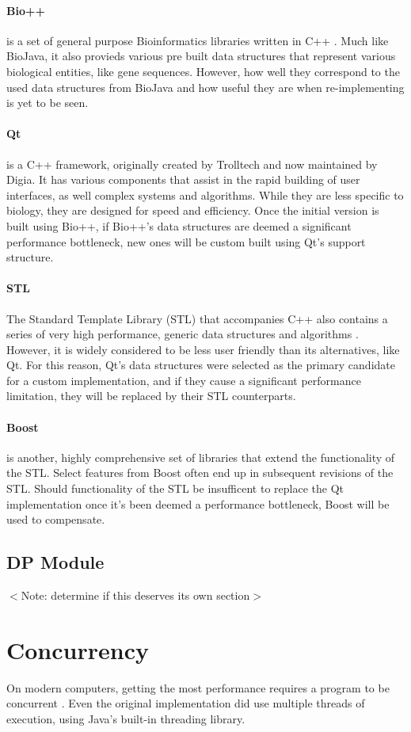\documentclass[a4paper,12pt]{report}
\begin{document}
\paragraph{Bio++}
is a set of general purpose Bioinformatics libraries written in C++ \autocite{bpp}. Much like BioJava, it also provieds various pre built data structures that represent various biological entities, like gene sequences. However, how well they correspond to the used data structures from BioJava and how useful they are when re-implementing is yet to be seen.

\paragraph{Qt}
is a C++ framework, originally created by Trolltech and now maintained by Digia. It has various components that assist in the rapid building of user interfaces, as well complex systems and algorithms. While they are less specific to biology, they are designed for speed and efficiency. Once the initial version is built using Bio++, if Bio++'s data structures are deemed a significant performance bottleneck, new ones will be custom built using Qt's support structure.

\paragraph{STL}
The Standard Template Library (STL) that accompanies C++ also contains a series of very high performance, generic data structures and algorithms \autocite{stl}. However, it is widely considered to be less user friendly than its alternatives, like Qt. For this reason, Qt's data structures were selected as the primary candidate for a custom implementation, and if they cause a significant performance limitation, they will be replaced by their STL counterparts.

\paragraph{Boost}
is another, highly comprehensive set of libraries that extend the functionality of the STL. Select features from Boost often end up in subsequent revisions of the STL. Should functionality of the STL be insufficent to replace the Qt implementation once it's been deemed a performance bottleneck, Boost will be used to compensate.

\subsection{DP Module}
$<$Note: determine if this deserves its own section$>$

\section{Concurrency}
On modern computers, getting the most performance requires a program to be concurrent \autocite{freelunch}. Even the original implementation did use multiple threads of execution, using Java's built-in threading library.

\printbibliography
\end{document}
